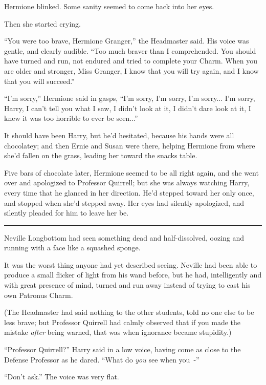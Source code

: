 Hermione blinked. Some sanity seemed to come back into her eyes.

Then she started crying.

``You were too brave, Hermione Granger,'' the Headmaster said. His voice was gentle, and clearly audible. ``Too much braver than I comprehended. You should have turned and run, not endured and tried to complete your Charm. When you are older and stronger, Miss Granger, I know that you will try again, and I know that you will succeed.''

``I'm sorry,'' Hermione said in gasps, ``I'm sorry, I'm sorry, I'm sorry... I'm sorry, Harry, I can't tell you what I saw, I didn't look at it, I didn't dare look at it, I knew it was too horrible to ever be seen...''

It should have been Harry, but he'd hesitated, because his hands were all chocolatey; and then Ernie and Susan were there, helping Hermione from where she'd fallen on the grass, leading her toward the snacks table.

Five bars of chocolate later, Hermione seemed to be all right again, and she went over and apologized to Professor Quirrell; but she was always watching Harry, every time that he glanced in her direction. He'd stepped toward her only once, and stopped when she'd stepped away. Her eyes had silently apologized, and silently pleaded for him to leave her be.

\begin{center}\rule{3in}{0.4pt}\end{center}

Neville Longbottom had seen something dead and half-dissolved, oozing and running with a face like a squashed sponge.

It was the worst thing anyone had yet described seeing. Neville had been able to produce a small flicker of light from his wand before, but he had, intelligently and with great presence of mind, turned and run away instead of trying to cast his own Patronus Charm.

(The Headmaster had said nothing to the other students, told no one else to be less brave; but Professor Quirrell had calmly observed that if you made the mistake \emph{after} being warned, that was when ignorance became stupidity.)

``Professor Quirrell?'' Harry said in a low voice, having come as close to the Defense Professor as he dared. ``What do \emph{you} see when you~-''

``Don't ask.'' The voice was very flat.

